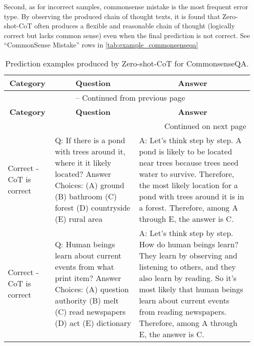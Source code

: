 \documentclass{article}
\newcommand{\CoT}{chain of thought\xspace}
\newcommand{\ours}{Zero-shot-CoT\xspace}
\newcommand{\okmark}{{\textbf{\textcolor[rgb]{0.1, 0.5, 0.1}{}}}}
\begin{document}
Second, as for incorrect samples, commonsense mistake is the most frequent error type. By observing the produced \CoT texts, it is found that \ours often produces a flexible and reasonable chain of thought (logically correct but lacks common sense) even when the final prediction is not correct. See ``CommonSense Mistake'' rows in \autoref{tab:example_commonsenseqa}

\begin{center}
\begin{longtable}{|p{}|p{}|p{}|}
\caption{Prediction examples produced by \ours for CommonsenseQA.}
\label{tab:example_commonsenseqa}\\

\toprule \multicolumn{1}{|c|}{\textbf{Category}} & \multicolumn{1}{c|}{\textbf{Question}} & \multicolumn{1}{c|}{\textbf{Answer}} \\ \midrule 
\endfirsthead

\multicolumn{3}{c}{{\tablename\ \thetable{} -- Continued from previous page}} \\
\toprule \multicolumn{1}{|c|}{\textbf{Category}} & \multicolumn{1}{c|}{\textbf{Question}} & \multicolumn{1}{c|}{\textbf{Answer}} \\ \midrule
\endhead

\multicolumn{3}{|r|}{{Continued on next page}} \\ \bottomrule
\endfoot

\bottomrule
\endlastfoot

Correct - CoT is correct &Q: If there is a pond with trees around it, where it it likely located? Answer Choices: (A) ground (B) bathroom (C) forest (D) countryside (E) rural area &A: Let's think step by step. A pond is likely to be located near trees because trees need water to survive. Therefore, the most likely location for a pond with trees around it is in a forest. Therefore, among A through E, the answer is C. \okmark \\

\midrule

Correct - CoT is correct &Q: Human beings learn about current events from what print item? Answer Choices: (A) question authority (B) melt (C) read newspapers (D) act (E) dictionary &A: Let's think step by step. How do human beings learn? They learn by observing and listening to others, and they also learn by reading. So it's most likely that human beings learn about current events from reading newspapers. Therefore, among A through E, the answer is C. \okmark \\


\end{longtable}
\end{center}
\end{document}
